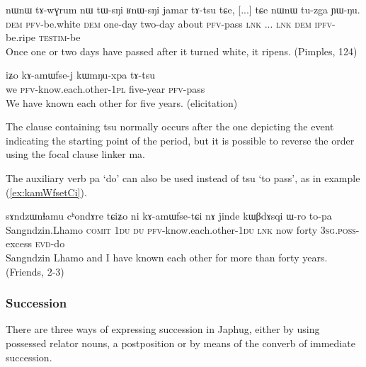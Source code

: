\documentclass[oldfontcommands,oneside,a4paper,11pt]{article}
\newcommand{\ipa}[1]{{\phon \mbox{#1}}} %
\newcommand{\refb}[1]{(\ref{#1})}
\begin{document}
\begin{exe}
\ex \label{ex:tAwGrum}
\gll 
\ipa{nɯnɯ}   	\ipa{tɤ-wɣrum}   	\ipa{nɯ}   	\ipa{tɯ-sŋi}   	\ipa{ʁnɯ-sŋi}   	\ipa{jamar}   	\ipa{tɤ-tsu}   	\ipa{tɕe,}   	[...] 	\ipa{tɕe}   	\ipa{nɯnɯ}   	\ipa{tu-zga}   	\ipa{ɲɯ-ŋu.}   \\
\textsc{dem} \textsc{pfv}-be.white \textsc{dem} one-day two-day about \textsc{pfv}-pass \textsc{lnk} ... \textsc{lnk} \textsc{dem} \textsc{ipfv}-be.ripe \textsc{testim}-be \\
\glt  Once one or two days have passed after it turned white, it   ripens. (Pimples, 124)
\end{exe}


\begin{exe}
\ex \label{ex:kamWfsej}
\gll  
\ipa{iʑo}   	\ipa{kɤ-amɯfse-j}   	\ipa{kɯmŋu-xpa}   	\ipa{tɤ-tsu}   \\
we \textsc{pfv}-know.each.other-\textsc{1pl} five-year \textsc{pfv}-pass \\
\glt  We have known each other for five years. (elicitation)
\end{exe}


The clause containing \ipa{tsu} normally occurs after the one depicting the event indicating the starting point of the period, but it is possible to reverse the order using the focal clause linker \ipa{ma}.

The auxiliary verb \ipa{pa} `do' can also be used instead of \ipa{tsu} `to pass', as in example \refb{ex:kamWfsetCi}.
\begin{exe}
\ex \label{ex:kamWfsetCi}
\gll  
\ipa{sɤndzɯnɬamu}  	\ipa{cʰondɤre}  	\ipa{tɕiʑo}  	\ipa{ni}  	\ipa{kɤ-amɯfse-tɕi}  	\ipa{nɤ}  	\ipa{jinde}  	\ipa{kɯβdɤsqi}  	\ipa{ɯ-ro}  	\ipa{to-pa}  \\
Sangndzin.Lhamo \textsc{comit} \textsc{1du} \textsc{du}  \textsc{pfv}-know.each.other-\textsc{1du} \textsc{lnk} now forty  \textsc{3sg.poss}-excess \textsc{evd}-do \\
\glt Sangndzin Lhamo and I have known each other for more than forty years. (Friends, 2-3)
\end{exe}

\subsubsection{Succession} \label{sec:succession}
There are three ways of expressing succession in Japhug, either by using possessed relator nouns, a   postposition or by means of the  converb of immediate succession.  
\end{document}
